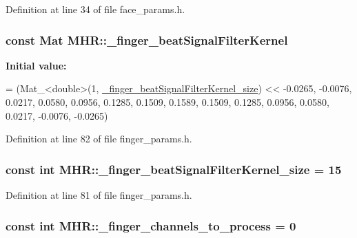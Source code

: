 Definition at line 34 of file face\+\_\+params.\+h.

\hypertarget{namespace_m_h_r_a7c6f13da1b28c69fdd787e07d05c7503}{
\subsubsection[{\+\_\+finger\+\_\+beat\+Signal\+Filter\+Kernel}]{\setlength{\rightskip}{0pt plus 5cm}const Mat M\+H\+R\+::\+\_\+finger\+\_\+beat\+Signal\+Filter\+Kernel}}\label{namespace_m_h_r_a7c6f13da1b28c69fdd787e07d05c7503}
{\bfseries Initial value\+:}
\begin{DoxyCode}
= (Mat\_<double>(1, \hyperlink{namespace_m_h_r_a9b1303d740470ce969352e3173a27ebb}{\_finger\_beatSignalFilterKernel\_size}) <<
                                              -0.0265, -0.0076, 0.0217, 0.0580, 0.0956,
                                              0.1285, 0.1509, 0.1589, 0.1509, 0.1285,
                                              0.0956, 0.0580, 0.0217, -0.0076, -0.0265)
\end{DoxyCode}


Definition at line 82 of file finger\+\_\+params.\+h.

\hypertarget{namespace_m_h_r_a9b1303d740470ce969352e3173a27ebb}{
\subsubsection[{\+\_\+finger\+\_\+beat\+Signal\+Filter\+Kernel\+\_\+size}]{\setlength{\rightskip}{0pt plus 5cm}const int M\+H\+R\+::\+\_\+finger\+\_\+beat\+Signal\+Filter\+Kernel\+\_\+size = 15}}\label{namespace_m_h_r_a9b1303d740470ce969352e3173a27ebb}


Definition at line 81 of file finger\+\_\+params.\+h.

\hypertarget{namespace_m_h_r_a16934905e88de3a2d084e6734948ec65}{
\subsubsection[{\+\_\+finger\+\_\+channels\+\_\+to\+\_\+process}]{\setlength{\rightskip}{0pt plus 5cm}const int M\+H\+R\+::\+\_\+finger\+\_\+channels\+\_\+to\+\_\+process = 0}}\label{namespace_m_h_r_a16934905e88de3a2d084e6734948ec65}


